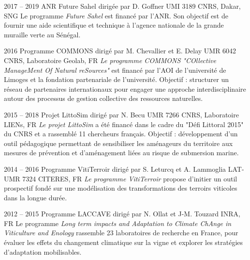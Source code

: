 \documentclass[]{cv-etienne}
\begin{document}
\begin{entrylist}
\entry
{2017 -- 2019}
{ANR Future Sahel {\normalfont dirigée par D. Goffner}}
{UMI 3189 CNRS, Dakar, SNG}
{Le programme \emph{Future Sahel} est financé par l'ANR. Son objectif est de fournir une aide scientifique et technique à l'agence nationale de la grande muraille verte au Sénégal.}
\end{entrylist}
\begin{entrylist}
\entry
{2016}
{Programme COMMONS {\normalfont dirigé par M. Chevallier et E. Delay}}
{UMR 6042 CNRS, Laboratoire Geolab, FR}
{\emph{Le programme COMMONS "\textit{COllective ManageMent Of Natural reSources}"} est financé par l'AOI de l'université de Limoges et la fondation partenariale de l'université. Objectif : structurer un réseau de partenaires internationaux pour engager une approche interdisciplinaire autour des processus de gestion collective des ressources naturelles.}
\end{entrylist}
\begin{entrylist}
\entry
{2015 -- 2018}
{Projet LittoSim {\normalfont dirigé par N. Becu}}
{UMR 7266 CNRS, Laboratoire LIENs, FR}
{\emph{Le projet LittoSim} a été financé dans le cadre du "Défi Littoral 2015" du CNRS et a rassemblé 11 chercheurs français. Objectif : développement d'un outil pédagogique permettant de sensibiliser les aménageurs du territoire aux mesures de prévention et d'aménagement liées au risque de submersion marine.}
\end{entrylist}
\begin{entrylist}
\entry
{2014 -- 2016}
{Programme VitiTerroir {\normalfont dirigé par S. Leturcq et A. Lammoglia}}
{LAT-UMR 7324 CITERES, FR}
{\emph{Le programme VitiTerroir} propose d'initier un outil prospectif fondé sur une modélisation des transformations des terroirs viticoles dans la longue durée.}
\end{entrylist}
\begin{entrylist}
\entry
{2012 -- 2015}
{Programme LACCAVE {\normalfont dirigé par N. Ollat et J-M. Touzard}}
{INRA, FR}
{Le programme \emph{Long term impacts and Adaptation to Climate ChAnge in Viticulture and Enology} rassemble 23 laboratoires de recherche en France, pour évaluer les effets du changement climatique sur la vigne et explorer les stratégies d'adaptation mobilisables.}
\end{entrylist}
\end{document}
